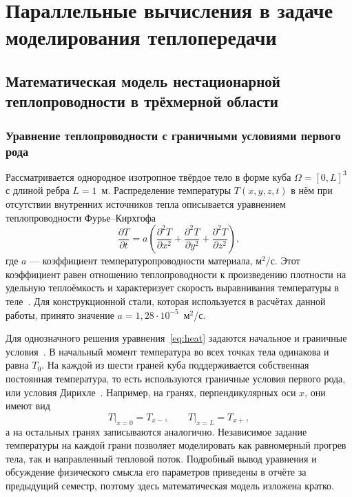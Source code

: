 \chapter{Параллельные вычисления в задаче моделирования теплопередачи}

\section{Математическая модель нестационарной теплопроводности в трёхмерной области}

\subsection{Уравнение теплопроводности с граничными условиями первого рода}

Рассматривается однородное изотропное твёрдое тело в форме куба $\Omega = [0, L]^3$ с длиной ребра $L = 1$~м. Распределение температуры $T(x, y, z, t)$ в нём при отсутствии внутренних источников тепла описывается уравнением теплопроводности Фурье--Кирхгофа~\cite{сергиенко2004исследование}
\begin{equation}
    \frac{\partial T}{\partial t} = a \left( \frac{\partial^2 T}{\partial x^2} + \frac{\partial^2 T}{\partial y^2} + \frac{\partial^2 T}{\partial z^2} \right),
    \label{eq:heat}
\end{equation}
где $a$ --- коэффициент температуропроводности материала, м$^2$/с. Этот коэффициент равен отношению теплопроводности к произведению плотности на удельную теплоёмкость и характеризует скорость выравнивания температуры в теле~\cite{vlasov2004research}. Для конструкционной стали, которая используется в расчётах данной работы, принято значение $a = 1{,}28 \cdot 10^{-5}$~м$^2$/с.

Для однозначного решения уравнения~\eqref{eq:heat} задаются начальное и граничные условия~\cite{luo2010effect}. В начальный момент температура во всех точках тела одинакова и равна $T_0$. На каждой из шести граней куба поддерживается собственная постоянная температура, то есть используются граничные условия первого рода, или условия Дирихле~\cite{дирихлерешении}. Например, на гранях, перпендикулярных оси $x$, они имеют вид
\begin{equation}
    T\big|_{x=0} = T_{x-}, \qquad T\big|_{x=L} = T_{x+},
\end{equation}
а на остальных гранях записываются аналогично. Независимое задание температуры на каждой грани позволяет моделировать как равномерный прогрев тела, так и направленный тепловой поток. Подробный вывод уравнения и обсуждение физического смысла его параметров приведены в отчёте за предыдущий семестр, поэтому здесь математическая модель изложена кратко.

